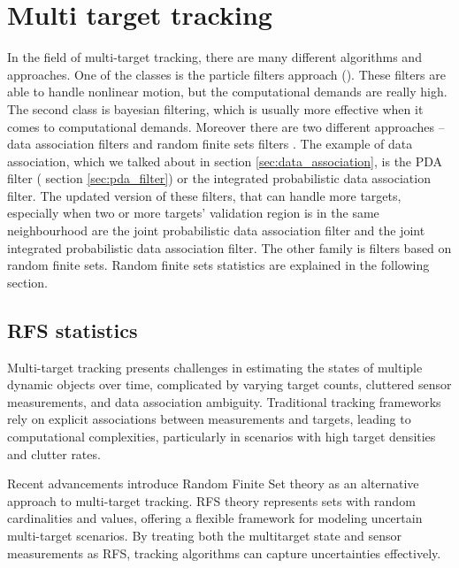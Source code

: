 \section{Multi target tracking}
In the field of multi-target tracking, there are many different algorithms and approaches. One of the classes is the
particle filters approach (\cite{Particle_Khan2005, Particle_Gustafsson2002, Particle_Doucet2001,
    nonlinearParticleFilter}). These filters are able to handle nonlinear motion, but the computational demands are
really high. The second class is bayesian filtering, which is usually more effective when it comes to computational
demands. Moreover there are two different approaches -- data association filters and random finite sets filters
. The example of data association, which we talked about in section \ref{sec:data_association}, is the PDA filter (
section \ref{sec:pda_filter}) or the integrated probabilistic data association filter. The updated version of these
filters, that can handle more targets, especially when two or more targets' validation region is in the same neighbourhood are the joint probabilistic data association filter and the joint integrated probabilistic data association filter. The other family is filters based on random finite sets. Random finite sets statistics are explained in the following section.
    \subsection{RFS statistics}
Multi-target tracking presents challenges in estimating the states of multiple dynamic objects over time, complicated
by varying target counts, cluttered sensor measurements, and data association ambiguity. Traditional tracking
frameworks rely on explicit associations between measurements and targets, leading to computational complexities, particularly in scenarios with high target densities and clutter rates.

Recent advancements introduce Random Finite Set theory as an alternative approach to multi-target tracking. RFS
theory represents sets with random cardinalities and values, offering a flexible framework for modeling uncertain
multi-target scenarios. By treating both the multitarget state and sensor measurements as RFS, tracking algorithms
can capture uncertainties effectively.

